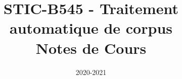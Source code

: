 
\graphicspath{{images/}}

\title{STIC-B545 - Traitement automatique de corpus \\ Notes de Cours}
\date{2020-2021}


\maketitle
\tableofcontents
\newpage


\newpage


